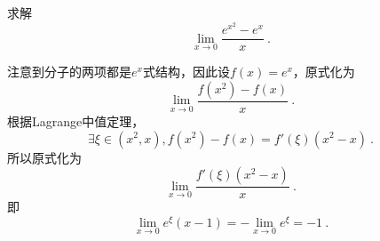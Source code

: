 \begin{example}{}
求解 $$\lim_{x\to0} \frac{e^{x^2}-e^x}{x}~.$$

注意到分子的两项都是$e^x$式结构，因此设$f(x)=e^x$，原式化为$$\lim_{x\to0} \frac{f(x^2)-f(x)}{x}~.$$
根据Lagrange中值定理， $$\exists \xi \in (x^2,x), f(x^2)-f(x) = f'(\xi)(x^2-x)~.$$
所以原式化为 $$\lim_{x\to0} \frac{f'(\xi)(x^2-x)}{x}~.$$
即$$\lim_{x\to0} e^\xi(x-1)=-\lim_{x\to0} e^\xi=-1~.$$
\end{example}

